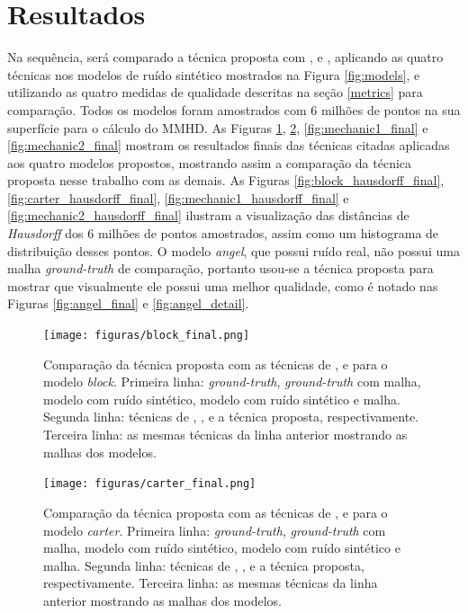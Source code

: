 \section{Resultados}
\label{sec:resultados}

Na sequência, será comparado a técnica proposta com \cite{zhang2015guided}, \cite{sun2007fast} e \cite{zheng2011bilateral}, aplicando as quatro técnicas nos modelos de ruído sintético mostrados na Figura \ref{fig:models}, e utilizando as quatro medidas de qualidade descritas na seção \ref{metrics} para comparação. Todos os modelos foram amostrados com 6 milhões de pontos na sua superfície para o cálculo do MMHD. As Figuras \ref{fig:block_final}, \ref{fig:carter_final}, \ref{fig:mechanic1_final} e \ref{fig:mechanic2_final} mostram os resultados finais das técnicas citadas aplicadas aos quatro modelos propostos, mostrando assim a comparação da técnica proposta nesse trabalho com as demais. As Figuras \ref{fig:block_hausdorff_final}, \ref{fig:carter_hausdorff_final}, \ref{fig:mechanic1_hausdorff_final} e \ref{fig:mechanic2_hausdorff_final} ilustram a visualização das distâncias de \textit{Hausdorff} dos 6 milhões de pontos amostrados, assim como um histograma de distribuição desses pontos. O modelo \textit{angel}, que possui ruído real, não possui uma malha \textit{ground-truth} de comparação, portanto usou-se a técnica proposta para mostrar que visualmente ele possui uma melhor qualidade, como é notado nas Figuras \ref{fig:angel_final} e \ref{fig:angel_detail}.



\begin{figure}[p]
\captionsetup{width=\linewidth}
\centering
\texttt{[image: figuras/block\_final.png]}
\caption{Comparação da técnica proposta com as técnicas de \cite{zhang2015guided}, \cite{sun2007fast} e \cite{zheng2011bilateral} para o modelo \textit{block}. Primeira linha: \textit{ground-truth}, \textit{ground-truth} com malha, modelo com ruído sintético, modelo com ruído sintético e malha. Segunda linha: técnicas de \cite{zhang2015guided}, \cite{sun2007fast}, \cite{zheng2011bilateral} e a técnica proposta, respectivamente. Terceira linha: as mesmas técnicas da linha anterior mostrando as malhas dos modelos.}
\label{fig:block_final}
\end{figure}

\clearpage

\begin{figure}[p]
\captionsetup{width=\linewidth}
\centering
\texttt{[image: figuras/carter\_final.png]}
\caption{Comparação da técnica proposta com as técnicas de \cite{zhang2015guided}, \cite{sun2007fast} e \cite{zheng2011bilateral} para o modelo \textit{carter}. Primeira linha: \textit{ground-truth}, \textit{ground-truth} com malha, modelo com ruído sintético, modelo com ruído sintético e malha. Segunda linha: técnicas de \cite{zhang2015guided}, \cite{sun2007fast}, \cite{zheng2011bilateral} e a técnica proposta, respectivamente. Terceira linha: as mesmas técnicas da linha anterior mostrando as malhas dos modelos.}
\label{fig:carter_final}
\end{figure}

